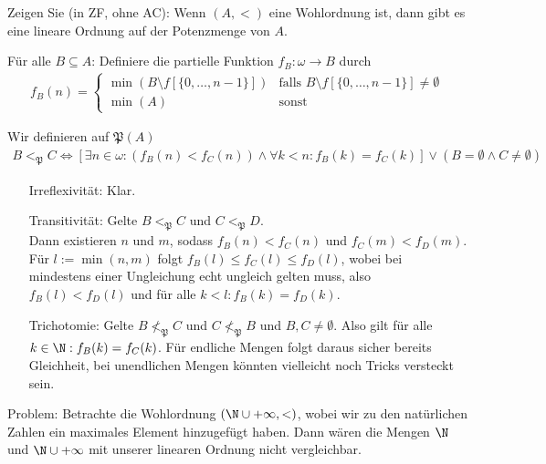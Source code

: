 
\begin{exercise}[287]

Zeigen Sie (in ZF, ohne AC): Wenn $(A,<)$ eine Wohlordnung ist, dann gibt es eine
lineare Ordnung auf der Potenzmenge von $A$.
\end{exercise}


\begin{solution}
Für alle $B \subseteq A$: Definiere die partielle Funktion $f_B: \omega \to B$ durch
\begin{align*}
  f_B(n) = \begin{cases}
    \min(B \setminus f[\{0,\dots,n-1\}]) & \text{falls }
    B \setminus f[\{0,\dots,n-1\}] \neq \emptyset \\
    \min(A) & \text{sonst}
  \end{cases}
\end{align*}

Wir definieren auf $\mathfrak{P}(A)$
\begin{align*}
  B <_\mathfrak{P} C \iff [\exists n \in \omega: (f_B(n) < f_C(n)) \land \forall k < n: f_B(k) = f_C(k)] \lor (B = \emptyset \land C \neq \emptyset)
\end{align*}

\begin{itemize}
  \item[Irreflexivität:] Klar.
  \item[Transitivität:] Gelte $B <_\mathfrak{P} C$ und $C <_\mathfrak{P} D$. \\
  Dann existieren $n$ und $m$, sodass
  $f_B(n) < f_C(n)$ und $f_C(m) < f_D(m)$. Für $l := \min(n,m)$
  folgt $f_B(l) \leq f_C(l) \leq f_D(l)$, wobei bei mindestens einer Ungleichung
  echt ungleich gelten muss, also $f_B(l) < f_D(l)$ und für alle $k < l: f_B(k) = f_D(k)$.

  \item[Trichotomie:] Gelte $B \nless_\mathfrak{P} C$ und $C \nless_\mathfrak{P} B$
  und $B, C \neq \emptyset$. Also gilt für alle $k \in \N: f_B(k) = f_C(k)$.
  Für endliche Mengen folgt daraus sicher bereits Gleichheit, bei
  unendlichen Mengen könnten vielleicht noch Tricks versteckt sein. \\
\end{itemize}
Problem: Betrachte die Wohlordnung $(\N \cup +\infty, <)$, wobei wir zu den
natürlichen Zahlen ein maximales Element hinzugefügt haben. Dann wären die Mengen
$\N$ und $\N \cup +\infty$ mit unserer linearen Ordnung nicht vergleichbar.

\end{solution}

